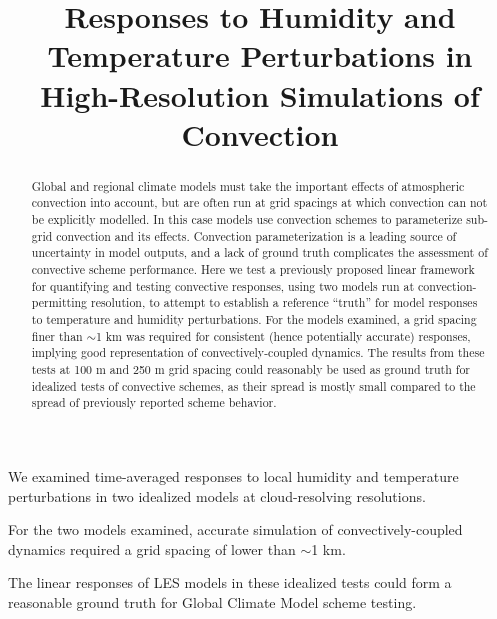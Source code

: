 \documentclass[draft]{agujournal2019}
\begin{document}
\title{Responses to Humidity and Temperature Perturbations in High-Resolution Simulations of Convection}




\begin{keypoints}
    \item We examined time-averaged responses to local humidity and temperature
    perturbations in two idealized models at cloud-resolving resolutions.
    \item For the two models examined, accurate simulation of
    convectively-coupled dynamics required a grid spacing of lower than $\sim$1
    km.
    \item The linear responses of LES models in these idealized tests could form
    a reasonable ground truth for Global Climate Model scheme testing.
\end{keypoints}

\justifying

\begin{abstract}
Global and regional climate models must take the important effects of
atmospheric convection into account, but are often run at grid spacings at which
convection can not be explicitly modelled. In this case models use convection
schemes to parameterize sub-grid convection and its effects. Convection
parameterization is a leading source of uncertainty in model outputs, and a lack
of ground truth complicates the assessment of convective scheme performance.
Here we test a previously proposed linear framework for quantifying and testing
convective responses, using two models run at convection-permitting resolution,
to attempt to establish a reference ``truth'' for model responses to temperature
and humidity perturbations. For the models examined, a grid spacing finer than
$\sim$1 km was required for consistent (hence potentially accurate) responses,
implying good representation of convectively-coupled dynamics. The results from
these tests at 100 m and 250 m grid spacing could reasonably be used as ground
truth for idealized tests of convective schemes, as their spread is mostly small
compared to the spread of previously reported scheme behavior.
\end{abstract}
\end{document}
